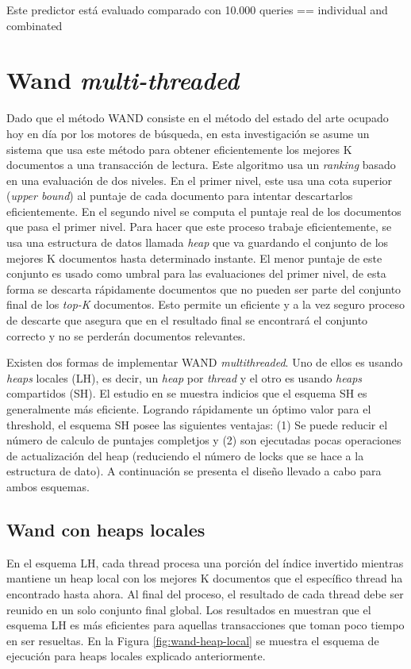 Este predictor está evaluado comparado con 10.000 queries == individual and combinated


\section{Wand \textit{multi-threaded}}
\label{scheduling:wm}
Dado que el método WAND \citep{Broder:2003} consiste en el método del estado del arte ocupado hoy en día por los motores de búsqueda, en esta investigación se asume un sistema que usa este método para obtener eficientemente los mejores K documentos a una transacción de lectura. Este algoritmo usa un \textit{ranking} basado en una evaluación de dos niveles. En el primer nivel, este usa una cota superior (\textit{upper bound}) al puntaje de cada documento para intentar descartarlos eficientemente. En el segundo nivel se computa el puntaje real de los documentos que pasa el primer nivel. Para hacer que este proceso trabaje eficientemente, se usa una estructura de datos llamada \textit{heap} que va guardando el conjunto de los mejores K documentos hasta determinado instante. El menor puntaje de este conjunto es usado como umbral para las evaluaciones del primer nivel, de esta forma se descarta rápidamente documentos que no pueden ser parte del conjunto final de los \textit{top-K} documentos. Esto permite un eficiente y a la vez seguro proceso de descarte que asegura que en el resultado final se encontrará el conjunto correcto y no se perderán documentos relevantes.

Existen dos formas de implementar WAND \textit{multithreaded}. Uno de ellos es usando \textit{heaps} locales (LH), es decir, un \textit{heap} por \textit{thread} y el otro es usando \textit{heaps} compartidos (SH). El estudio en \citep{Rojas:2013} se muestra indicios que el esquema SH es generalmente más eficiente. Logrando rápidamente un óptimo valor para el threshold, el esquema SH posee las siguientes ventajas: (1) Se puede reducir el número de calculo de puntajes completjos y (2) son ejecutadas pocas operaciones de actualización del heap (reduciendo el número de locks que se hace a la estructura de dato). A continuación se presenta el diseño llevado a cabo para ambos esquemas.


\subsection{Wand con heaps locales}
\label{scheduling:whl}
En el esquema LH, cada thread procesa una porción del índice invertido mientras mantiene un heap local con los mejores K documentos que el específico thread ha encontrado hasta ahora. Al final del proceso, el resultado de cada thread debe ser reunido en un solo conjunto final global. Los resultados en \citep{Rojas:2013} muestran que el esquema LH es más eficientes para aquellas transacciones que toman poco tiempo en ser resueltas. En la Figura \ref{fig:wand-heap-local} se muestra el esquema de ejecución para heaps locales explicado anteriormente. 

